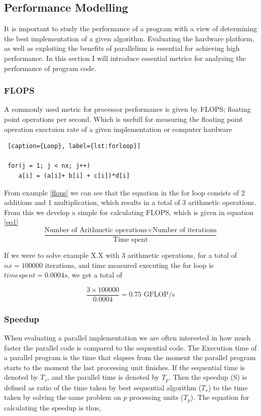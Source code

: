 
\subsection{Performance Modelling}
It is important to study the performance of a program with a view of determining the best implementation of a given algorithm. Evaluating the hardware platform, as well as exploiting the benefits of parallelism is essential for achieving high performance. In this section I will introduce essential metrics for analysing the performance of program code.

\subsubsection{FLOPS}
\label{subsubsec:flops}
A commonly used metric for processor performance is given by FLOPS; floating point operations per second. Which is usefull for measuring the floating point operation exectuion rate of a given implementation or computer hardware

\begin{lstlisting} [caption={Loop}, label={lst:forloop}]

 for(j = 1; j < nx; j++)
 	a[i] = (a[i]+ b[i] + c[i])*d[i]

\end{lstlisting}

From example \ref{flops} we can see that the equation in the for loop consists of  2 additions and 1 multiplication, which results in a total of 3 arithmetic operations. From this we develop a simple for calculating FLOPS, which is given in equation \ref{eq1}
\begin{equation} \label{eq1}
\frac{\textrm{Number of Arithmetic operations} \times \textrm{Number of iterations}}{\textrm{Time spent}} 
\end{equation}

If we were to solve example X.X with 3 arithmetic operations, for a total of 
 \(nx = 100 000\) iterations, and time measured executing the for loop is  \(time spent = 0.0004 s\), we get a total of
 
 \begin{equation} 
\frac{3 \times 100 000}{0.0004} = 0.75 \textrm{ GFLOP/s}
\end{equation}

\subsubsection{Speedup}
When evaluating a parallel implementation we are often interested in how much faster the parallel code is compared to the sequential code.
The Execution time of a parallel program is the time that elapses from the moment the parallel program starts to the moment the last processing unit finishes. If the sequential time is denoted by \(T_s\), and the parallel time is denoted by \(T_p\). Then the speedup (S) is defined as ratio of the time taken by best sequential algorithm (\(T_s\)) to the time taken by solving the same problem on \(p\) processing units (\(T_p\)). The equation for calculating the speedup is thus, 

